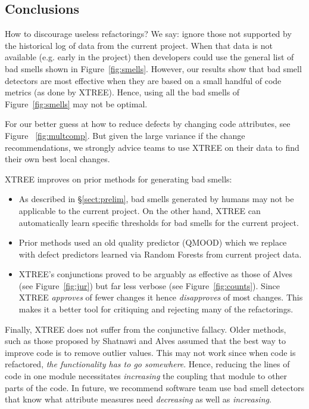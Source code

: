\documentclass[twocolumn,5p]{elsarticle}
\newcommand{\tion}[1]{\S\ref{sect:#1}}
\newcommand{\fig}[1]{Figure~\ref{fig:#1}}
\theoremstyle{break}
\begin{document}
\begin{itemize}
% 


\section{Conclusions}
How to discourage useless refactorings?
We say: ignore those not supported by the historical log of data from
the current project.  
When that data is not available (e.g. early
in the project) then developers could use the general list of
bad smells shown in \fig{smells}. However, 
our results
show that  bad smell detectors are most
effective when they are based
on a small handful of code metrics (as done by XTREE).
Hence, using all the bad smells of \fig{smells} may not be optimal. 

For our better guess at how to reduce defects by changing code attributes,
  see  Figure ~\ref{fig:multcomp}. But given the large variance if the change recommendations, we strongly advice teams to use
  XTREE on their data to find their own best local changes.

XTREE improves on prior methods for generating bad smells:
\begin{itemize}
    \item As described in \tion{prelim}, bad smells generated by humans may not be applicable to the current project. On the other hand, XTREE can automatically learn specific thresholds
    for bad smells for the current project.
    \item Prior methods used an old quality predictor (QMOOD) which we replace with defect predictors learned via Random Forests
    from   current project data.
      
    
    \item XTREE's conjunctions proved to be arguably as effective
    as those of Alves (see \fig{jur}) but far less verbose (see \fig{counts}). Since XTREE {\em approves} of fewer changes
    it hence {\em disapproves} of most changes. This makes it a better tool for critiquing and rejecting
    many of the refactorings.
\end{itemize}
Finally, XTREE does not suffer from the conjunctive fallacy.
    Older methods, such as those proposed by  Shatnawi and Alves assumed
    that the best way to improve code is to remove outlier  values. This may not work since when code is refactored,
    {\em the functionality has to go somewhere}. Hence,  reducing the lines of code in one module necessitates   
    {\em increasing} the coupling that module
    to other parts of the code. In future, we recommend software team use bad smell detectors that know what attribute measures
    need {\em decreasing} as well as {\em increasing}.
    

\end{itemize}
\end{document}
